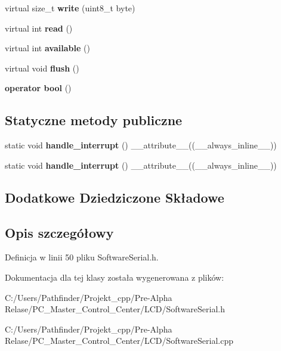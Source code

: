 \begin{DoxyCompactItemize}
virtual size\+\_\+t {\bfseries write} (uint8\+\_\+t byte)
\item 
\mbox{\label{class_software_serial_af6d7c49b7ccf5c92cd4bdea2c5c51f48}} 
virtual int {\bfseries read} ()
\item 
\mbox{\label{class_software_serial_ad5e6b6484193f9a2dbaf3131899b6eee}} 
virtual int {\bfseries available} ()
\item 
\mbox{\label{class_software_serial_aeb34e4965efca5ebf402e0b737e40546}} 
virtual void {\bfseries flush} ()
\item 
\mbox{\label{class_software_serial_ab0cba63b2a27fcfa4760a2f3f7389de0}} 
{\bfseries operator bool} ()
\end{DoxyCompactItemize}
\subsection*{Statyczne metody publiczne}
\begin{DoxyCompactItemize}
\item 
\mbox{\label{class_software_serial_a8700c768d3c5d681362253324852ceee}} 
static void {\bfseries handle\+\_\+interrupt} () \+\_\+\+\_\+attribute\+\_\+\+\_\+((\+\_\+\+\_\+always\+\_\+inline\+\_\+\+\_\+))
\item 
\mbox{\label{class_software_serial_ac2401da36f0349d105935030699d70da}} 
static void {\bfseries handle\+\_\+interrupt} () \+\_\+\+\_\+attribute\+\_\+\+\_\+((\+\_\+\+\_\+always\+\_\+inline\+\_\+\+\_\+))
\end{DoxyCompactItemize}
\subsection*{Dodatkowe Dziedziczone Składowe}


\subsection{Opis szczegółowy}


Definicja w linii 50 pliku Software\+Serial.\+h.



Dokumentacja dla tej klasy została wygenerowana z plików\+:\begin{DoxyCompactItemize}
\item 
C\+:/\+Users/\+Pathfinder/\+Projekt\+\_\+cpp/\+Pre-\/\+Alpha Relase/\+P\+C\+\_\+\+Master\+\_\+\+Control\+\_\+\+Center/\+L\+C\+D/Software\+Serial.\+h\item 
C\+:/\+Users/\+Pathfinder/\+Projekt\+\_\+cpp/\+Pre-\/\+Alpha Relase/\+P\+C\+\_\+\+Master\+\_\+\+Control\+\_\+\+Center/\+L\+C\+D/Software\+Serial.\+cpp\end{DoxyCompactItemize}

